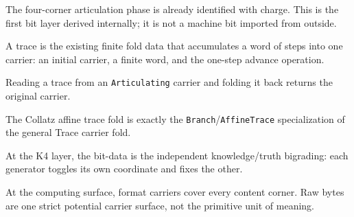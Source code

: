 \begin{theorem}\label{thm:articulation-it-bit-byte}\leanok{}
The four-corner articulation phase is already identified with charge.  This is
the first bit layer derived internally; it is not a machine bit imported from outside.
\end{theorem}

\begin{definition}\label{def:trace-fold-carrier}\leanok{}
A trace is the existing finite fold data that accumulates a word of steps into
one carrier: an initial carrier, a finite word, and the one-step advance
operation.
\end{definition}

\begin{theorem}\label{thm:articulating-trace-reconstructs}\leanok{}
Reading a trace from an \texttt{Articulating} carrier and folding it back
returns the original carrier.
\end{theorem}

\begin{theorem}\label{thm:collatz-affine-trace-specializes}\leanok{}
The Collatz affine trace fold is exactly the \texttt{Branch}/\texttt{AffineTrace}
specialization of the general Trace carrier fold.
\end{theorem}

\begin{theorem}\label{thm:k4-it-bit-byte}\leanok{}
At the K4 layer, the bit-data is the independent knowledge/truth bigrading:
each generator toggles its own coordinate and fixes the other.
\end{theorem}

\begin{theorem}\label{thm:format-corner-byte-surface}\leanok{}
At the computing surface, format carriers cover every content corner.  Raw
bytes are one strict potential carrier surface, not the primitive unit of
meaning.
\end{theorem}

